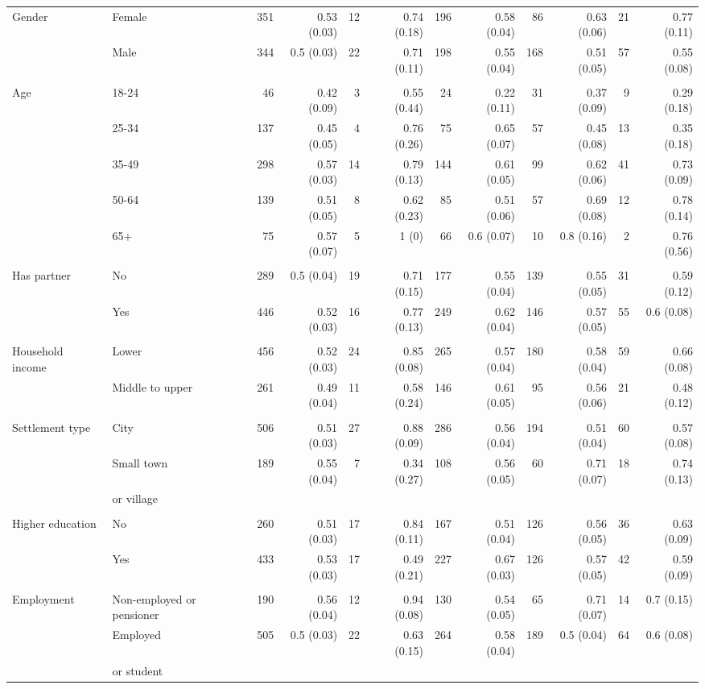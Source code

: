 \begin{tabular}{p{1.3in}p{1.1in}rrrrrrrrrr}
	Gender & Female & 351 & 0.53 (0.03) & 12 & 0.74 (0.18) & 196 & 0.58 (0.04) & 86 & 0.63 (0.06) & 21 & 0.77 (0.11) \\ 
	& Male & 344 & 0.5 (0.03) & 22 & 0.71 (0.11) & 198 & 0.55 (0.04) & 168 & 0.51 (0.05) & 57 & 0.55 (0.08) \\ 
		\vspace{1pt}\\
	Age & 18-24 & 46 & 0.42 (0.09) & 3 & 0.55 (0.44) & 24 & 0.22 (0.11) & 31 & 0.37 (0.09) & 9 & 0.29 (0.18) \\ 
	& 25-34 & 137 & 0.45 (0.05) & 4 & 0.76 (0.26) & 75 & 0.65 (0.07) & 57 & 0.45 (0.08) & 13 & 0.35 (0.18) \\ 
	& 35-49 & 298 & 0.57 (0.03) & 14 & 0.79 (0.13) & 144 & 0.61 (0.05) & 99 & 0.62 (0.06) & 41 & 0.73 (0.09) \\ 
	& 50-64 & 139 & 0.51 (0.05) & 8 & 0.62 (0.23) & 85 & 0.51 (0.06) & 57 & 0.69 (0.08) & 12 & 0.78 (0.14) \\ 
	& 65+ & 75 & 0.57 (0.07) & 5 & 1 (0) & 66 & 0.6 (0.07) & 10 & 0.8 (0.16) & 2 & 0.76 (0.56) \\ 
		\vspace{1pt}\\
	Has partner & No & 289 & 0.5 (0.04) & 19 & 0.71 (0.15) & 177 & 0.55 (0.04) & 139 & 0.55 (0.05) & 31 & 0.59 (0.12) \\ 
	& Yes & 446 & 0.52 (0.03) & 16 & 0.77 (0.13) & 249 & 0.62 (0.04) & 146 & 0.57 (0.05) & 55 & 0.6 (0.08) \\
		\vspace{1pt}\\
	Household income & Lower & 456 & 0.52 (0.03) & 24 & 0.85 (0.08) & 265 & 0.57 (0.04) & 180 & 0.58 (0.04) & 59 & 0.66 (0.08) \\ 
	& Middle to upper & 261 & 0.49 (0.04) & 11 & 0.58 (0.24) & 146 & 0.61 (0.05) & 95 & 0.56 (0.06) & 21 & 0.48 (0.12) \\ 
		\vspace{1pt}\\
	Settlement type & City & 506 & 0.51 (0.03) & 27 & 0.88 (0.09) & 286 & 0.56 (0.04) & 194 & 0.51 (0.04) & 60 & 0.57 (0.08) \\ 
	& Small town & 189 & 0.55 (0.04) & 7 & 0.34 (0.27) & 108 & 0.56 (0.05) & 60 & 0.71 (0.07) & 18 & 0.74 (0.13) \\ 
	& or village \\
		\vspace{1pt}\\
	Higher education & No & 260 & 0.51 (0.03) & 17 & 0.84 (0.11) & 167 & 0.51 (0.04) & 126 & 0.56 (0.05) & 36 & 0.63 (0.09) \\ 
	& Yes & 433 & 0.53 (0.03) & 17 & 0.49 (0.21) & 227 & 0.67 (0.03) & 126 & 0.57 (0.05) & 42 & 0.59 (0.09) \\ 
		\vspace{1pt}\\
	Employment & Non-employed or pensioner & 190 & 0.56 (0.04) & 12 & 0.94 (0.08) & 130 & 0.54 (0.05) & 65 & 0.71 (0.07) & 14 & 0.7 (0.15) \\ 
	& Employed  & 505 & 0.5 (0.03) & 22 & 0.63 (0.15) & 264 & 0.58 (0.04) & 189 & 0.5 (0.04) & 64 & 0.6 (0.08) \\ 
	& or student
		

\end{tabular}
